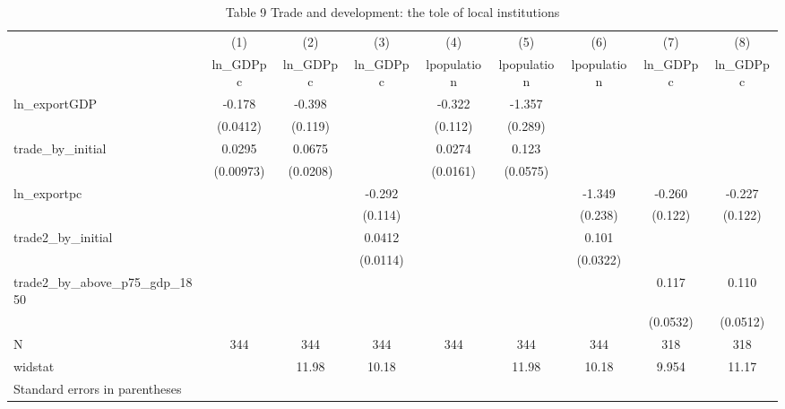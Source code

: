 \begin{table}[htbp]\centering
\caption{Table 9 Trade and development: the tole of local institutions}
\begin{tabular}{l*{8}{c}}
\hline\hline
            &\multicolumn{1}{c}{(1)}&\multicolumn{1}{c}{(2)}&\multicolumn{1}{c}{(3)}&\multicolumn{1}{c}{(4)}&\multicolumn{1}{c}{(5)}&\multicolumn{1}{c}{(6)}&\multicolumn{1}{c}{(7)}&\multicolumn{1}{c}{(8)}\\
            &\multicolumn{1}{c}{ln\_GDPpc}&\multicolumn{1}{c}{ln\_GDPpc}&\multicolumn{1}{c}{ln\_GDPpc}&\multicolumn{1}{c}{lpopulation}&\multicolumn{1}{c}{lpopulation}&\multicolumn{1}{c}{lpopulation}&\multicolumn{1}{c}{ln\_GDPpc}&\multicolumn{1}{c}{ln\_GDPpc}\\
\hline
ln\_exportGDP&      -0.178&      -0.398&            &      -0.322&      -1.357&            &            &            \\
            &    (0.0412)&     (0.119)&            &     (0.112)&     (0.289)&            &            &            \\
[1em]
trade\_by\_initial&      0.0295&      0.0675&            &      0.0274&       0.123&            &            &            \\
            &   (0.00973)&    (0.0208)&            &    (0.0161)&    (0.0575)&            &            &            \\
[1em]
ln\_exportpc &            &            &      -0.292&            &            &      -1.349&      -0.260&      -0.227\\
            &            &            &     (0.114)&            &            &     (0.238)&     (0.122)&     (0.122)\\
[1em]
trade2\_by\_initial&            &            &      0.0412&            &            &       0.101&            &            \\
            &            &            &    (0.0114)&            &            &    (0.0322)&            &            \\
[1em]
trade2\_by\_above\_p75\_gdp\_1850&            &            &            &            &            &            &       0.117&       0.110\\
            &            &            &            &            &            &            &    (0.0532)&    (0.0512)\\
\hline
N           &         344&         344&         344&         344&         344&         344&         318&         318\\
widstat     &            &       11.98&       10.18&            &       11.98&       10.18&       9.954&       11.17\\
\hline\hline
\multicolumn{9}{l}{\footnotesize Standard errors in parentheses}\\
\end{tabular}
\end{table}
